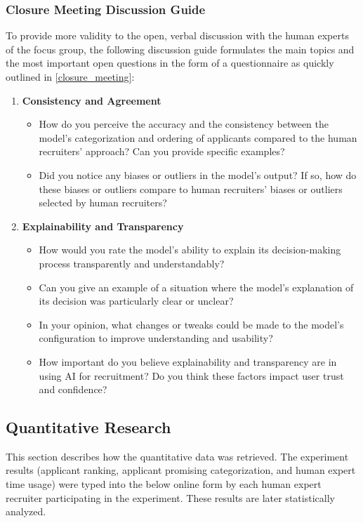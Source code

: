 \documentclass[draft,final]{thesisclass} %
\begin{document}
\subsubsection{Closure Meeting Discussion Guide}
To provide more validity to the open, verbal discussion with the human experts of the focus group, the following discussion guide formulates the main topics and the most important open questions in the form of a questionnaire as quickly outlined in \ref{closure_meeting}:
\begin{enumerate}
    \item \textbf{Consistency and Agreement}
    \begin{itemize}
        \item How do you perceive the accuracy and the consistency between the model's categorization and ordering of applicants compared to the human recruiters' approach? Can you provide specific examples?
        \item Did you notice any biases or outliers in the model's output? If so, how do these biases or outliers compare to human recruiters' biases or outliers selected by human recruiters?
    \end{itemize}
    \item \textbf{Explainability and Transparency}
    \begin{itemize}
        \item How would you rate the model's ability to explain its decision-making process transparently and understandably?
        \item Can you give an example of a situation where the model's explanation of its decision was particularly clear or unclear?
        \item In your opinion, what changes or tweaks could be made to the model's configuration to improve understanding and usability?
        \item How important do you believe explainability and transparency are in using \acs{AI} for recruitment? Do you think these factors impact user trust and confidence?
    \end{itemize}
\end{enumerate}

\subsection{Quantitative Research}
This section describes how the quantitative data was retrieved.
The experiment results (applicant ranking, applicant promising categorization, and human expert time usage) were typed into the below online form by each human expert recruiter participating in the experiment.
These results are later statistically analyzed.
\end{document}

